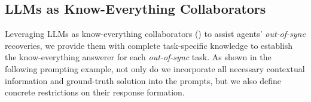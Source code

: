 \subsection{LLMs as Know-Everything Collaborators}
\label{Appendix D: LLM-simulated Human Answerer}

Leveraging LLMs as know-everything collaborators () to assist agents' \textit{out-of-sync} recoveries, we provide them with complete task-specific knowledge to establish the know-everything answerer for each \textit{out-of-sync} task.
As shown in the following prompting example, not only do we incorporate all necessary contextual information and ground-truth solution into the prompts, but we also define concrete restrictions on their response formation. 

